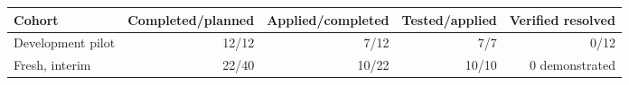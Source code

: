 \begin{tabular}{lrrrr}
\toprule
Cohort & Completed/planned & Applied/completed & Tested/applied & Verified resolved \\
\midrule
Development pilot & 12/12 & 7/12 & 7/7 & 0/12 \\
Fresh, interim & 22/40 & 10/22 & 10/10 & 0 demonstrated \\
\bottomrule
\end{tabular}
